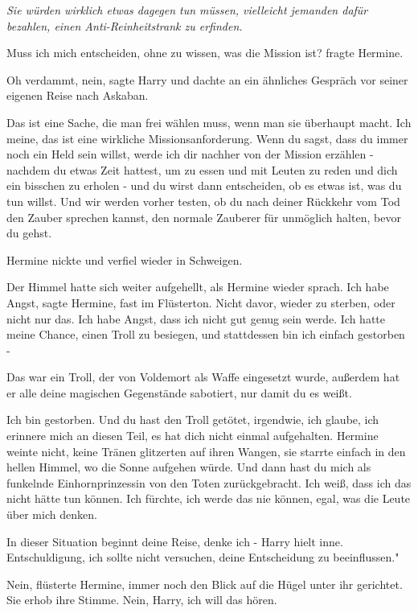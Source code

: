 \emph{Sie würden wirklich etwas dagegen tun müssen, vielleicht jemanden dafür bezahlen, einen Anti-Reinheitstrank zu erfinden. }

\glqq Muss ich mich entscheiden, ohne zu wissen, was die Mission ist?\grqq{}
fragte Hermine.

\glqq Oh verdammt, nein\grqq{}, sagte Harry und dachte an ein ähnliches Gespräch
vor seiner eigenen Reise nach Askaban.

\glqq Das ist eine Sache, die man frei wählen muss, wenn man sie überhaupt
macht. Ich meine, das ist eine wirkliche Missionsanforderung. Wenn du sagst,
dass du immer noch ein Held sein willst, werde ich dir nachher von der Mission
erzählen - nachdem du etwas Zeit hattest, um zu essen und mit Leuten zu reden
und dich ein bisschen zu erholen - und du wirst dann entscheiden, ob es etwas
ist, was du tun willst. Und wir werden vorher testen, ob du nach deiner Rückkehr
vom Tod den Zauber sprechen kannst, den normale Zauberer für unmöglich halten,
bevor du gehst.\grqq{}

Hermine nickte und verfiel wieder in Schweigen.

Der Himmel hatte sich weiter aufgehellt, als Hermine wieder sprach. \glqq Ich
habe Angst\grqq{}, sagte Hermine, fast im Flüsterton. \glqq Nicht davor, wieder
zu sterben, oder nicht nur das. Ich habe Angst, dass ich nicht gut genug sein
werde. Ich hatte meine Chance, einen Troll zu besiegen, und stattdessen bin ich
einfach gestorben -\grqq{}

\glqq Das war ein Troll, der von Voldemort als Waffe eingesetzt wurde, außerdem
hat er alle deine magischen Gegenstände sabotiert, nur damit du es weißt.\grqq{}

\glqq Ich bin gestorben. Und du hast den Troll getötet, irgendwie, ich glaube,
ich erinnere mich an diesen Teil, es hat dich nicht einmal aufgehalten.\grqq{}
Hermine weinte nicht, keine Tränen glitzerten auf ihren Wangen, sie starrte
einfach in den hellen Himmel, wo die Sonne aufgehen würde. \glqq Und dann hast
du mich als funkelnde Einhornprinzessin von den Toten zurückgebracht. Ich weiß,
dass ich das nicht hätte tun können. Ich fürchte, ich werde das nie können,
egal, was die Leute über mich denken.\grqq{}

\glqq In dieser Situation beginnt deine Reise, denke ich -\grqq{} Harry hielt
inne. \glqq Entschuldigung, ich sollte nicht versuchen, deine Entscheidung zu
beeinflussen."

\glqq Nein\grqq{}, flüsterte Hermine, immer noch den Blick auf die Hügel unter
ihr gerichtet. Sie erhob ihre Stimme. \glqq Nein, Harry, ich will das
hören.\grqq{}

